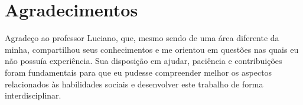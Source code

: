 \chapter*{Agradecimentos}
Agradeço ao professor Luciano, que, mesmo sendo de uma área diferente da minha, compartilhou seus conhecimentos e me orientou em questões nas quais eu não possuía experiência. Sua disposição em ajudar, paciência e contribuições foram fundamentais para que eu pudesse compreender melhor os aspectos relacionados às habilidades sociais e desenvolver este trabalho de forma interdisciplinar.
